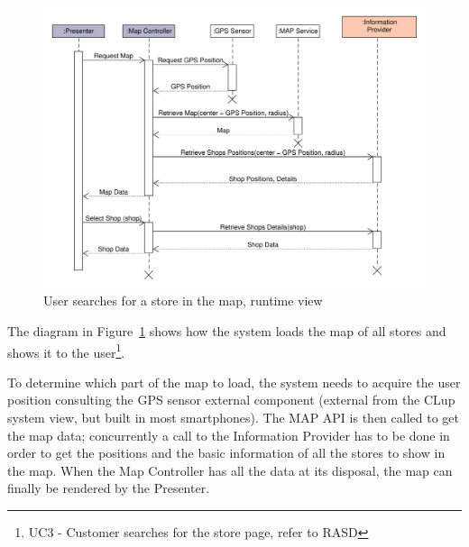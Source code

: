 \begin{figure}[H]
    \includegraphics[width=\textwidth]{Images/UML_user_map_sequence.pdf}
    \caption{\label{fig:UML_user_map_sequence}User searches for a store in the map, runtime view}
\end{figure}
The diagram in Figure~\ref{fig:UML_user_map_sequence} shows how the system loads the map of all stores and shows it to the user\footnote{UC3 - Customer searches for the store page, refer to RASD}.

To determine which part of the map to load, the system needs to acquire the user position consulting the GPS sensor external component (external from the CLup system view, but built in most smartphones). The MAP API is then called to get the map data; concurrently a call to the Information Provider has to be done in order to get the positions and the basic information of all the stores to show in the map. When the Map Controller has all the data at its disposal, the map can finally be rendered by the Presenter. 

